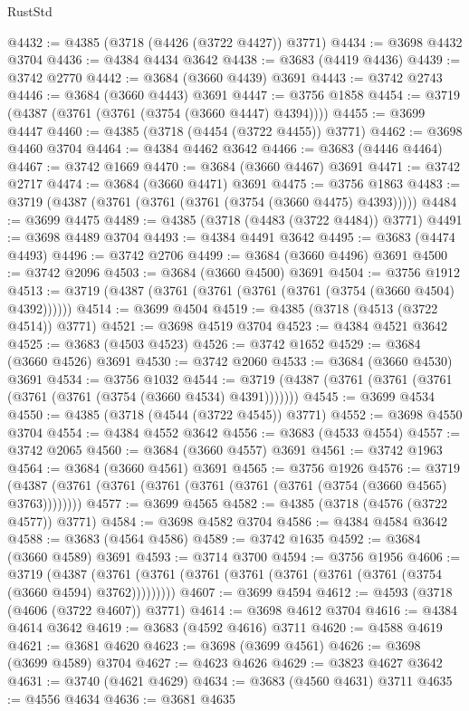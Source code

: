 \begin{lexlean}{RustStd}
\begin{coremodule}
@4432 := @4385 (@3718 (@4426 (@3722 @4427)) @3771)
@4434 := @3698 @4432 @3704
@4436 := @4384 @4434 @3642
@4438 := @3683 (@4419 @4436)
@4439 := @3742 @2770
@4442 := @3684 (@3660 @4439) @3691
@4443 := @3742 @2743
@4446 := @3684 (@3660 @4443) @3691
@4447 := @3756 @1858
@4454 := @3719 (@4387 (@3761 (@3761 (@3754 (@3660 @4447) @4394))))
@4455 := @3699 @4447
@4460 := @4385 (@3718 (@4454 (@3722 @4455)) @3771)
@4462 := @3698 @4460 @3704
@4464 := @4384 @4462 @3642
@4466 := @3683 (@4446 @4464)
@4467 := @3742 @1669
@4470 := @3684 (@3660 @4467) @3691
@4471 := @3742 @2717
@4474 := @3684 (@3660 @4471) @3691
@4475 := @3756 @1863
@4483 := @3719 (@4387 (@3761 (@3761 (@3761 (@3754 (@3660 @4475) @4393)))))
@4484 := @3699 @4475
@4489 := @4385 (@3718 (@4483 (@3722 @4484)) @3771)
@4491 := @3698 @4489 @3704
@4493 := @4384 @4491 @3642
@4495 := @3683 (@4474 @4493)
@4496 := @3742 @2706
@4499 := @3684 (@3660 @4496) @3691
@4500 := @3742 @2096
@4503 := @3684 (@3660 @4500) @3691
@4504 := @3756 @1912
@4513 := @3719 (@4387 (@3761 (@3761 (@3761 (@3761 (@3754 (@3660 @4504) @4392))))))
@4514 := @3699 @4504
@4519 := @4385 (@3718 (@4513 (@3722 @4514)) @3771)
@4521 := @3698 @4519 @3704
@4523 := @4384 @4521 @3642
@4525 := @3683 (@4503 @4523)
@4526 := @3742 @1652
@4529 := @3684 (@3660 @4526) @3691
@4530 := @3742 @2060
@4533 := @3684 (@3660 @4530) @3691
@4534 := @3756 @1032
@4544 := @3719 (@4387 (@3761 (@3761 (@3761 (@3761 (@3761 (@3754 (@3660 @4534) @4391)))))))
@4545 := @3699 @4534
@4550 := @4385 (@3718 (@4544 (@3722 @4545)) @3771)
@4552 := @3698 @4550 @3704
@4554 := @4384 @4552 @3642
@4556 := @3683 (@4533 @4554)
@4557 := @3742 @2065
@4560 := @3684 (@3660 @4557) @3691
@4561 := @3742 @1963
@4564 := @3684 (@3660 @4561) @3691
@4565 := @3756 @1926
@4576 := @3719 (@4387 (@3761 (@3761 (@3761 (@3761 (@3761 (@3761 (@3754 (@3660 @4565) @3763))))))))
@4577 := @3699 @4565
@4582 := @4385 (@3718 (@4576 (@3722 @4577)) @3771)
@4584 := @3698 @4582 @3704
@4586 := @4384 @4584 @3642
@4588 := @3683 (@4564 @4586)
@4589 := @3742 @1635
@4592 := @3684 (@3660 @4589) @3691
@4593 := @3714 @3700
@4594 := @3756 @1956
@4606 := @3719
    (@4387 (@3761 (@3761 (@3761 (@3761 (@3761 (@3761 (@3761 (@3754 (@3660 @4594) @3762)))))))))
@4607 := @3699 @4594
@4612 := @4593 (@3718 (@4606 (@3722 @4607)) @3771)
@4614 := @3698 @4612 @3704
@4616 := @4384 @4614 @3642
@4619 := @3683 (@4592 @4616) @3711
@4620 := @4588 @4619
@4621 := @3681 @4620
@4623 := @3698 (@3699 @4561)
@4626 := @3698 (@3699 @4589) @3704
@4627 := @4623 @4626
@4629 := @3823 @4627 @3642
@4631 := @3740 (@4621 @4629)
@4634 := @3683 (@4560 @4631) @3711
@4635 := @4556 @4634
@4636 := @3681 @4635

\end{coremodule}
\end{lexlean}
